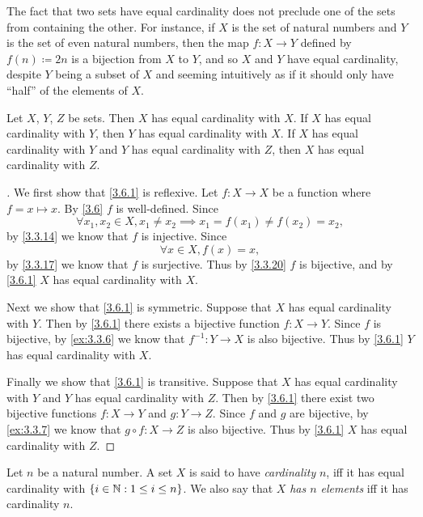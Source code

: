 \setcounter{thm}{2}
\begin{rmk}\label{3.6.3}
	The fact that two sets have equal cardinality does not preclude one of the sets from containing the other.
	For instance, if \(X\) is the set of natural numbers and \(Y\) is the set of even natural numbers, then the map \(f : X \to Y\) defined by \(f(n) \coloneqq 2n\) is a bijection from \(X\) to \(Y\), and so \(X\) and \(Y\) have equal cardinality, despite \(Y\) being a subset of \(X\) and seeming intuitively as if it should only have ``half'' of the elements of \(X\).
\end{rmk}

\begin{prop}\label{3.6.4}
	Let \(X\), \(Y\), \(Z\) be sets.
	Then \(X\) has equal cardinality with \(X\).
	If \(X\) has equal cardinality with \(Y\), then \(Y\) has equal cardinality with \(X\).
	If \(X\) has equal cardinality with \(Y\) and \(Y\) has equal cardinality with \(Z\), then \(X\) has equal cardinality with \(Z\).
\end{prop}

\begin{proof}[]
	We first show that \cref{3.6.1} is reflexive.
	Let \(f : X \to X\) be a function where \(f = x \mapsto x\).
	By \cref{3.6} \(f\) is well-defined.
	Since
	\[
		\forall x_1, x_2 \in X, x_1 \neq x_2 \implies x_1 = f(x_1) \neq f(x_2) = x_2,
	\]
	by \cref{3.3.14} we know that \(f\) is injective.
	Since
	\[
		\forall x \in X, f(x) = x,
	\]
	by \cref{3.3.17} we know that \(f\) is surjective.
	Thus by \cref{3.3.20} \(f\) is bijective, and by \cref{3.6.1} \(X\) has equal cardinality with \(X\).

	Next we show that \cref{3.6.1} is symmetric.
	Suppose that \(X\) has equal cardinality with \(Y\).
	Then by \cref{3.6.1} there exists a bijective function \(f : X \to Y\).
	Since \(f\) is bijective, by \cref{ex:3.3.6} we know that \(f^{-1} : Y \to X\) is also bijective.
	Thus by \cref{3.6.1} \(Y\) has equal cardinality with \(X\).

	Finally we show that \cref{3.6.1} is transitive.
	Suppose that \(X\) has equal cardinality with \(Y\) and \(Y\) has equal cardinality with \(Z\).
	Then by \cref{3.6.1} there exist two bijective functions \(f : X \to Y\) and \(g : Y \to Z\).
	Since \(f\) and \(g\) are bijective, by \cref{ex:3.3.7} we know that \(g \circ f : X \to Z\) is also bijective.
	Thus by \cref{3.6.1} \(X\) has equal cardinality with \(Z\).
\end{proof}

\begin{defn}\label{3.6.5}
	Let \(n\) be a natural number.
	A set \(X\) is said to have \emph{cardinality} \(n\), iff it has equal cardinality with \(\left\lbrace i \in \mathbb{N} : 1 \leq i \leq n\right\rbrace\).
	We also say that \(X\) \emph{has \(n\) elements} iff it has cardinality \(n\).
\end{defn}

